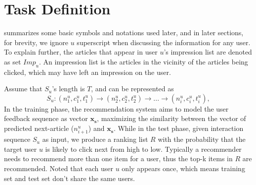 \section{Task Definition}
\label{sec:task}
 summarizes some basic symbols and notations used later, 
and in later sections, for brevity, we ignore $u$ superscript when discussing the information
for any user.
To explain further, the articles that appear in user $u$'s impression list are denoted as set $Imp_u$. An impression list is the articles in the vicinity of the articles
being clicked, which may have left an impression on the user.

Assume that $S_u$'s length is $T$, and can be represented as \[S_u: (n_1^u,c_1^u,t_1^u)\rightarrow(n_2^u,c_2^u,t_2^u)\rightarrow...\rightarrow(n_i^u,c_i^u,t_i^u),\] 
In the training phase, the recommendation system aims to model the 
user feedback sequence as vector $\mathbf{x_s}$, 
maximizing the similarity between
the vector of predicted next-article ($n_{i+1}^u$) and $\mathbf{x_s}$. 
While in the test phase, 
given interaction sequence $S_u$ as input, 
we produce a ranking list $R$ with the probability that the target user $u$ is likely to click next from high to low. 
Typically a recommender needs to recommend more
than one item for a user, thus the top-k items in $R$ are recommended.
Noted that each user $u$ only appears once, 
which means training set and test set don't share the same users. 


